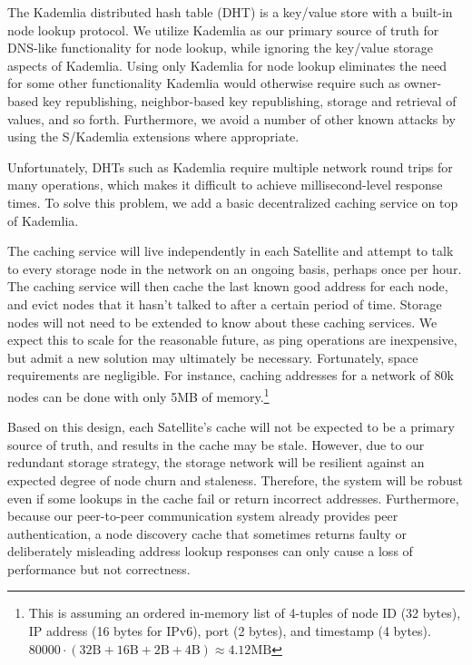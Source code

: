 \documentclass[8pt,fleqn,openany]{book}
\begin{document}
The Kademlia distributed hash table (DHT) is a key/value store with a built-in node lookup protocol.
We utilize Kademlia as our primary source of truth for DNS-like
functionality for node lookup, while ignoring the key/value storage aspects of
Kademlia.
Using only Kademlia for node lookup eliminates the need for some other
functionality Kademlia would otherwise require such as owner-based key
republishing, neighbor-based key republishing, storage and retrieval of values,
and so forth. Furthermore, we avoid a number of other known attacks by using the
S/Kademlia \cite{skad} extensions where appropriate.

Unfortunately, DHTs such as Kademlia require multiple network round trips for
many operations, which makes it difficult to achieve millisecond-level
response times. To solve this problem, we add a basic decentralized caching
service on top of Kademlia.

The caching service will live independently in each Satellite and
attempt to talk to every storage node in the network
on an ongoing basis, perhaps once per hour.
The caching service will then cache
the last known good address for each node, and evict nodes that it hasn't talked
to after a certain period of time.
Storage nodes will not need to be extended to know about these caching services.
We expect this to scale for the
reasonable future, as ping operations are inexpensive, but admit a new solution
may ultimately be necessary.
Fortunately, space requirements are negligible. For instance, caching addresses
for a network of 80k nodes
can be done with only 5MB of memory.\footnote{
This is assuming an ordered in-memory list of 4-tuples of node ID (32 bytes),
IP address (16 bytes for IPv6), port (2 bytes), and timestamp (4 bytes).
$80000\cdot(32 \mbox{B}+16 \mbox{B}+2 \mbox{B}+4 \mbox{B}) \approx 4.12 \mbox{MB}$
}

Based on this design, each Satellite's cache will not be expected to be a primary source
of truth, and results in the cache may be stale. However, due to our redundant
storage strategy, the storage network will be resilient against an expected
degree of node churn and staleness.
Therefore, the system will be robust even if some lookups in the cache
fail or return incorrect addresses.
Furthermore, because our peer-to-peer communication
system already provides peer authentication, a node discovery cache that
sometimes returns faulty
or deliberately misleading address lookup responses can only cause a
loss of performance but not correctness.
\end{document}
